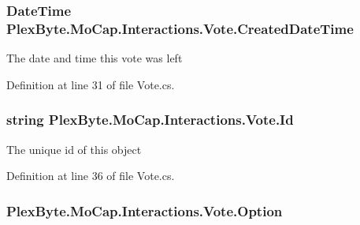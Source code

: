 \subsubsection[{\texorpdfstring{Created\+Date\+Time}{CreatedDateTime}}]{\setlength{\rightskip}{0pt plus 5cm}Date\+Time Plex\+Byte.\+Mo\+Cap.\+Interactions.\+Vote.\+Created\+Date\+Time\hspace{0.3cm}{\ttfamily [get]}}\hypertarget{class_plex_byte_1_1_mo_cap_1_1_interactions_1_1_vote_ae7cb6cc9d86a52d927f689c926a7e8a4}{}\label{class_plex_byte_1_1_mo_cap_1_1_interactions_1_1_vote_ae7cb6cc9d86a52d927f689c926a7e8a4}


The date and time this vote was left 



Definition at line 31 of file Vote.\+cs.

\subsubsection[{\texorpdfstring{Id}{Id}}]{\setlength{\rightskip}{0pt plus 5cm}string Plex\+Byte.\+Mo\+Cap.\+Interactions.\+Vote.\+Id\hspace{0.3cm}{\ttfamily [get]}}\hypertarget{class_plex_byte_1_1_mo_cap_1_1_interactions_1_1_vote_a9ee8f835267b3c453ca79564e11a365f}{}\label{class_plex_byte_1_1_mo_cap_1_1_interactions_1_1_vote_a9ee8f835267b3c453ca79564e11a365f}


The unique id of this object 



Definition at line 36 of file Vote.\+cs.

\subsubsection[{\texorpdfstring{Option}{Option}}]{ Plex\+Byte.\+Mo\+Cap.\+Interactions.\+Vote.\+Option\hspace{0.3cm}{\ttfamily [get]}}\hypertarget{class_plex_byte_1_1_mo_cap_1_1_interactions_1_1_vote_a84ca623bee92a24c658a532234f06a8f}{}\label{class_plex_byte_1_1_mo_cap_1_1_interactions_1_1_vote_a84ca623bee92a24c658a532234f06a8f}


